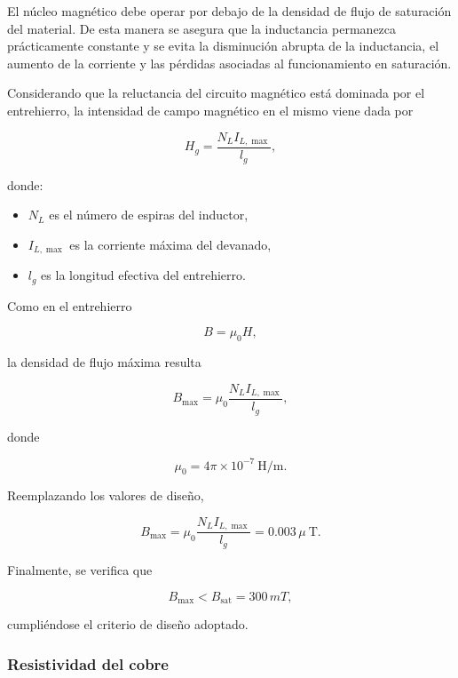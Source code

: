 \documentclass[]{article}
\begin{document}
	El núcleo magnético debe operar por debajo de la densidad de flujo de saturación del material. De esta manera se asegura que la inductancia permanezca prácticamente constante y se evita la disminución abrupta de la inductancia, el aumento de la corriente y las pérdidas asociadas al funcionamiento en saturación.
	
	
	
	Considerando que la reluctancia del circuito magnético está dominada por el entrehierro, la intensidad de campo magnético en el mismo viene dada por
	
	\begin{equation}
		H_g=\frac{N_LI_{L,\max}}{l_g},
		\label{eq:H_gap}
	\end{equation}
	
	donde:
	
	\begin{itemize}
		\item $N_L$ es el número de espiras del inductor,
		\item $I_{L,\max}$ es la corriente máxima del devanado,
		\item $l_g$ es la longitud efectiva del entrehierro.
	\end{itemize}
	
	Como en el entrehierro
	
	\[
	B=\mu_0H,
	\]
	
	la densidad de flujo máxima resulta
	
	\begin{equation}
		B_{\max}
		=
		\mu_0
		\frac{N_LI_{L,\max}}{l_g},
		\label{eq:Bmax_gap}
	\end{equation}
	
	donde
	
	\[
	\mu_0=4\pi\times10^{-7}\ \mathrm{H/m}.
	\]
	
	Reemplazando los valores de diseño,
	
	\[
	B_{\max}
	=
	\mu_0
	\frac{N_LI_{L,\max}}{l_g}
	= 0.003 \, \mu
	\ \mathrm{T}.
	\]
	
	Finalmente, se verifica que
	
	\begin{equation}
		B_{\max}
		<
		B_{\mathrm{sat}} = 300 \, mT,
	\end{equation}
	
	cumpliéndose el criterio de diseño adoptado.
	\subsubsection{Resistividad del cobre}
	
\end{document}
